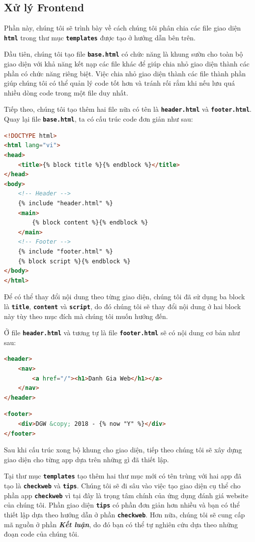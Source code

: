 \subsection{Xử lý Frontend}
Phần này, chúng tôi sẽ trình bày về cách chúng tôi phân chia các file giao diện \textbf{\texttt{html}} trong thư mục \textbf{\texttt{templates}} được tạo ở hướng dẫn bên trên.
\par
Đầu tiên, chúng tôi tạo file \textbf{\texttt{base.html}} có chức năng là khung sườn cho toàn bộ giao diện với khả năng kết nạp các file khác để giúp chia nhỏ giao diện thành các phần có chức năng riêng biệt. Việc chia nhỏ giao diện thành các file thành phần giúp chúng tôi có thể quản lý code tốt hơn và tránh rối rắm khi nếu lưu quá nhiều dòng code trong một file duy nhất.
\par
Tiếp theo, chúng tôi tạo thêm hai file nữa có tên là \textbf{\texttt{header.html}} và \textbf{\texttt{footer.html}}. Quay lại file \textbf{\texttt{base.html}}, ta có cấu trúc code đơn giản như sau:
\begin{lstlisting}[language=html]
<!DOCTYPE html>
<html lang="vi">
<head>
    <title>{% block title %}{% endblock %}</title>
</head>
<body>
    <!-- Header -->
    {% include "header.html" %}
    <main>
        {% block content %}{% endblock %}
    </main>
    <!-- Footer -->
    {% include "footer.html" %}
    {% block script %}{% endblock %}
</body>
</html>
\end{lstlisting}
\par
Để có thể thay đổi nội dung theo từng giao diện, chúng tôi đã sử dụng ba block là \textbf{\texttt{title}}, \textbf{\texttt{content}} và \textbf{\texttt{script}}, do đó chúng tôi sẽ thay đổi nội dung ở hai block này tùy theo mục đích mà chúng tôi muốn hướng đến.
\par
Ở file \textbf{\texttt{header.html}} và tương tự là file \textbf{\texttt{footer.html}} sẽ có nội dung cơ bản như sau:
\begin{lstlisting}[language=html]
<header>
    <nav>
        <a href="/"><h1>Danh Gia Web</h1></a>
    </nav>
</header>
\end{lstlisting}
\begin{lstlisting}[language=html]
<footer>
    <div>DGW &copy; 2018 - {% now "Y" %}</div>
</footer>
\end{lstlisting}
\par
Sau khi cấu trúc xong bộ khung cho giao diện, tiếp theo chúng tôi sẽ xây dựng giao diện cho từng app dựa trên những gì đã thiết lập.
\par
Tại thư mục \textbf{\texttt{templates}} tạo thêm hai thư mục mới có tên trùng với hai app đã tạo là \textbf{\texttt{checkweb}} và \textbf{\texttt{tips}}. Chúng tôi sẽ đi sâu vào việc tạo giao diện cụ thể cho phần app \textbf{\texttt{checkweb}} vì tại đây là trọng tâm chính của ứng dụng đánh giá website của chúng tôi. Phần giao diện \textbf{\texttt{tips}} có phần đơn giản hơn nhiều và bạn có thể thiết lập dựa theo hướng dẫn ở phần \textbf{\texttt{checkweb}}. Hơn nữa, chúng tôi sẽ cung cấp mã nguồn ở phần \textbf{\textit{Kết luận}}, do đó bạn có thể tự nghiên cứu dựa theo những đoạn code của chúng tôi.
